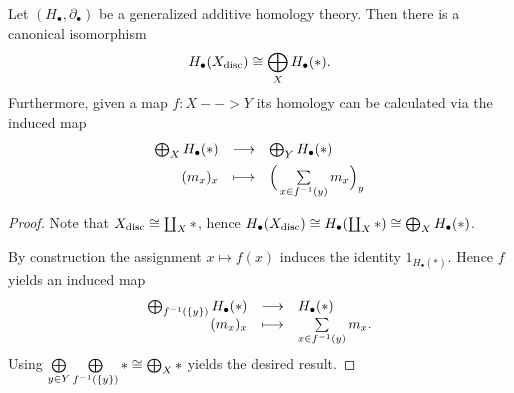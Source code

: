 	\begin{lemma}
		Let $(H_\bullet, \partial_\bullet)$ be a generalized additive homology theory. Then there is a canonical isomorphism
		\begin{equation*}
			H_\bullet(X_\text{disc}) \cong \bigoplus_X H_\bullet(*).
		\end{equation*}
		Furthermore, given a map $f:X --> Y$ its homology can be calculated via the induced map
		\begin{equation*}
			\begin{array}{rcl}
				\Oplus_X H_\bullet(*) & \longrightarrow & \Oplus_Y H_\bullet(*)\vspace{.5em}\\(m_x)_x & \longmapsto & \Big(\Sum \limits_{x \in f^{-1}(y)}m_x\Big)_y
			\end{array}
		\end{equation*}
	\end{lemma}
	\begin{proof}
		Note that $X_\text{disc} \cong \coprod_X *$, hence $H_\bullet(X_\text{disc}) \cong H_\bullet(\coprod_X *) \cong \bigoplus_X H_\bullet(*)$.

		By construction the assignment $x \mapsto f(x)$ induces the identity $1_{H_\bullet(*)}$. Hence $f$ yields an induced map
		\begin{equation*}
			\begin{array}{rcl}
				\bigoplus_{f^{-1}(\{y\})} H_\bullet(*) &\longrightarrow& H_\bullet(*)\\
				(m_x)_x & \longmapsto & \sum \limits_{x \in f^{-1}(y)} m_x.
			\end{array}
		\end{equation*}
		Using $\bigoplus \limits_{y\in Y} \bigoplus \limits_{f^{-1}(\{y\})} * \cong \bigoplus_X *$ yields the desired result. 
	\end{proof}

